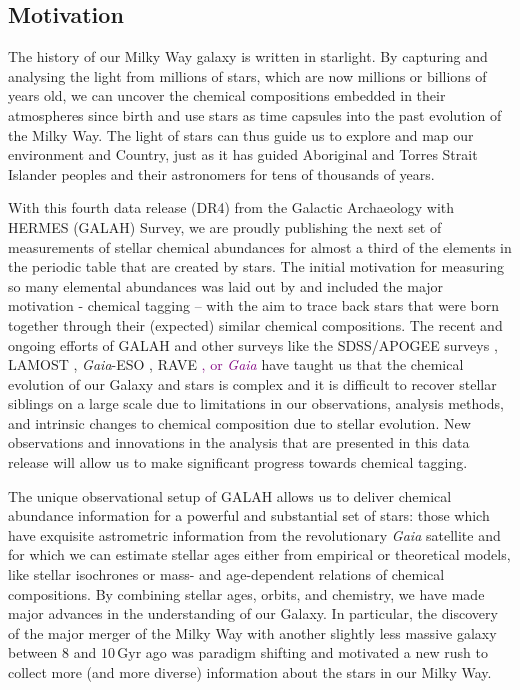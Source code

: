 \documentclass[
  journal=pasa,
  manuscript=research-paper, %
  year=2024,
  volume=37
]{cup-journal}
\newcommand{\adjusted}[1]{{\textcolor{purple}{#1}}}
\newcommand{\Gaia}{\textit{Gaia}\xspace}
\begin{document}
\subsection{Motivation} \label{sec:motivation}

The history of our Milky Way galaxy is written in starlight. By capturing and analysing the light from millions of stars, which are now millions or billions of years old, we can uncover the chemical compositions embedded in their atmospheres since birth and use stars as time capsules into the past evolution of the Milky Way. The light of stars can thus guide us to explore and map our environment and Country, just as it has guided Aboriginal and Torres Strait Islander peoples and their astronomers for tens of thousands of years.

With this fourth data release (DR4) from the Galactic Archaeology with HERMES (GALAH) Survey, we are proudly publishing the next set of measurements of stellar chemical abundances for almost a third of the elements in the periodic table that are created by stars. The initial motivation for measuring so many elemental abundances was laid out by \citet{DeSilva2015} and included the major motivation - chemical tagging -- with the aim to trace back stars that were born together through their (expected) similar chemical compositions. The recent and ongoing efforts of GALAH and other surveys like the SDSS/APOGEE surveys \citep[e.g.][]{SDSSDR17, Kollmeier2017}, LAMOST \citep{Zhao2012}, \Gaia-ESO \citep{Gilmore2022,Hourihane2023}, RAVE \citep{Steinmetz2020a}\adjusted{, or \Gaia \citep{RecioBlanco2023}} have taught us that the chemical evolution of our Galaxy and stars is complex and it is difficult to recover stellar siblings on a large scale due to limitations in our observations, analysis methods, and intrinsic changes to chemical composition due to stellar evolution. New observations and innovations in the analysis that are presented in this data release will allow us to make significant progress towards chemical tagging.

The unique observational setup of GALAH allows us to deliver chemical abundance information for a powerful and substantial set of stars: those which have exquisite astrometric information from the revolutionary \Gaia satellite \citep{Gaia-Collaboration2016} and for which we can estimate stellar ages either from empirical or theoretical models, like stellar isochrones or mass- and age-dependent relations of chemical compositions. By combining stellar ages, orbits, and chemistry, we have made major advances in the understanding of our Galaxy. In particular, the discovery of the major merger of the Milky Way with another slightly less massive galaxy between 8 and $10\,\mathrm{Gyr}$ ago \citep{Belokurov2018, Helmi2018} was paradigm shifting and motivated a new rush to collect more (and more diverse) information about the stars in our Milky Way.
\end{document}
